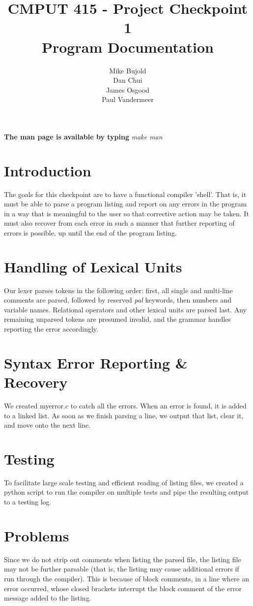 \documentclass{report}
\title{CMPUT 415 - Project Checkpoint 1\\Program Documentation}
\author{Mike Bujold \\
Dan Chui \\ 
James Osgood \\
Paul Vandermeer}
\begin{document}
\maketitle
\textbf{The man page is available by typing} \emph{make man}

\section*{Introduction}
The goals for this checkpoint are to have a functional compiler 'shell'. That is, it must be able to parse a program listing and report on any errors in the program in a way that is meaningful to the user so that corrective action may be taken. It must also recover from each error in such a manner that further reporting of errors is possible, up until the end of the program listing.


\section*{Handling of Lexical Units}
Our lexer parses tokens in the following order: first, all single and multi-line comments are parsed, followed by reserved \emph{pal} keywords, then numbers and variable names. Relational operators and other lexical units are parsed last. Any remaining unparsed tokens are presumed invalid, and the grammar handles reporting the error accordingly.

\section*{Syntax Error Reporting \& Recovery}
We created myerror.c to catch all the errors. When an error is found, it is added to a linked list. As soon as we finish parsing a line, we output that list, clear it, and move onto the next line. 
\lipsum[4-5]

\section*{Testing}
To facilitate large scale testing and efficient reading of listing files, we created a python script to run the compiler on multiple tests and pipe the resulting output to a testing log.

\section*{Problems}
Since we do not strip out comments when listing the parsed file, the listing file may not be further parsable (that is, the listing may cause additional errors if run through the compiler). This is because of block comments, in a line where an error occurred, whose closed brackets interrupt the block comment of the error message added to the listing.
\lipsum[6]
\end{document}
